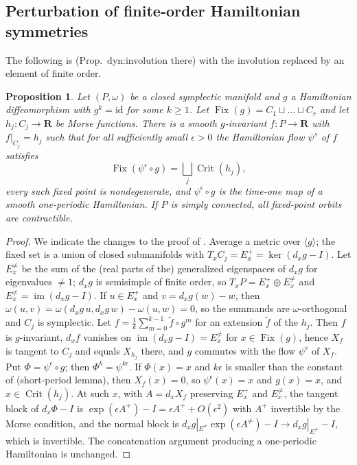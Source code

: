 \documentclass[11pt]{amsart}
\numberwithin{equation}{section}
\newtheorem{proposition}[theorem]{Proposition}
\theoremstyle{definition}
\theoremstyle{remark}
\newcommand{\R}{\mathbf R}
\DeclareMathOperator{\Crit}{Crit}
\DeclareMathOperator{\Fix}{Fix}
\newcommand{\id}{\mathrm{id}}
\begin{document}
\subsection{Perturbation of finite-order Hamiltonian symmetries}

The following is \cite[Prop.~4.2]{OpenAI22} (Prop.~dyn:involution there)
with the involution replaced by an element of finite order.

\begin{proposition}\label{prop:perturb}
Let $(P,\omega)$ be a closed symplectic manifold and $g$ a Hamiltonian
diffeomorphism with $g^k=\id$ for some $k\ge1$. Let
$\Fix(g)=C_1\sqcup\dots\sqcup C_r$ and let $h_j\colon C_j\to\R$ be Morse
functions. There is a smooth $g$-invariant $f\colon P\to\R$ with
$f|_{C_j}=h_j$ such that for all sufficiently small $\epsilon>0$ the
Hamiltonian flow $\psi^s$ of $f$ satisfies
\[
  \Fix(\psi^\epsilon\circ g)=\bigsqcup_j\Crit(h_j),
\]
every such fixed point is nondegenerate, and $\psi^\epsilon\circ g$ is the
time-one map of a smooth one-periodic Hamiltonian. If $P$ is simply
connected, all fixed-point orbits are contractible.
\end{proposition}

\begin{proof}
We indicate the changes to the proof of \cite[Prop.~4.2]{OpenAI22}.
Average a metric over $\langle g\rangle$; the fixed set is a union of
closed submanifolds with $T_xC_j=E_x^+=\ker(d_xg-I)$. Let $E_x^{\ne}$ be
the sum of the (real parts of the) generalized eigenspaces of $d_xg$ for
eigenvalues $\ne1$; $d_xg$ is semisimple of finite order, so
$T_xP=E_x^+\oplus E_x^{\ne}$ and $E_x^{\ne}=\operatorname{im}(d_xg-I)$.
If $u\in E_x^+$ and $v=d_xg(w)-w$, then
$\omega(u,v)=\omega(d_xg\,u,d_xg\,w)-\omega(u,w)=0$, so the summands are
$\omega$-orthogonal and $C_j$ is symplectic. Let
$f=\frac1k\sum_{m=0}^{k-1}\widetilde f\circ g^m$ for an extension
$\widetilde f$ of the $h_j$. Then $f$ is $g$-invariant, $d_xf$ vanishes on
$\operatorname{im}(d_xg-I)=E_x^{\ne}$ for $x\in\Fix(g)$, hence $X_f$ is
tangent to $C_j$ and equals $X_{h_j}$ there, and $g$ commutes with the flow
$\psi^s$ of $X_f$. Put $\Phi=\psi^\epsilon\circ g$; then
$\Phi^k=\psi^{k\epsilon}$. If $\Phi(x)=x$ and $k\epsilon$ is smaller than
the constant of \cite[Lemma~4.1]{OpenAI22} (short-period lemma), then
$X_f(x)=0$, so $\psi^\epsilon(x)=x$ and $g(x)=x$, and $x\in\Crit(h_j)$.
At such $x$, with $A=d_xX_f$ preserving $E^+_x$ and $E^{\ne}_x$, the tangent
block of $d_x\Phi-I$ is $\exp(\epsilon A^+)-I=\epsilon A^++O(\epsilon^2)$
with $A^+$ invertible by the Morse condition, and the normal block is
$d_xg|_{E^{\ne}}\exp(\epsilon A^{\ne})-I\to d_xg|_{E^{\ne}}-I$, which is
invertible. The concatenation argument producing a one-periodic
Hamiltonian is unchanged.
\end{proof}
\end{document}
